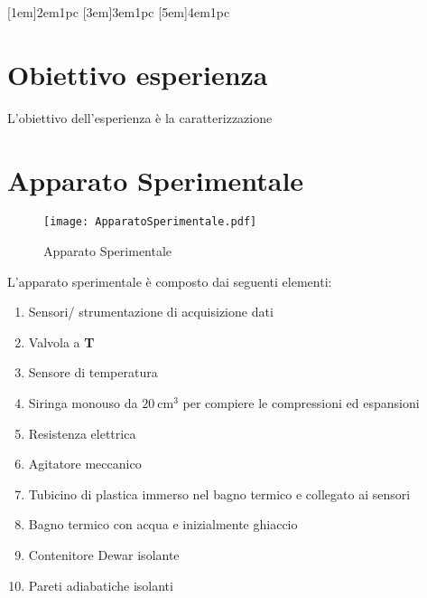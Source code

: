 \documentclass[a4paper,11pt,oneside]{article}
\begin{document}

\clearpage
\tableofcontents
{}
\contentsmargin{6em}
[1em]{\bigskip}{2em}{1pc}
[3em]{\smallskip}{3em}{1pc}
[5em]{\smallskip}{4em}{1pc}


\newpage


\section{Obiettivo esperienza}
L'obiettivo dell'esperienza è la caratterizzazione

\section{Apparato Sperimentale}
\begin{figure}[h!]
    \centering
    \texttt{[image: ApparatoSperimentale.pdf]}
    \caption{Apparato Sperimentale}
    \label{fig:apparato_sperimentale}
\end{figure}

L'apparato sperimentale è composto dai seguenti elementi: 
\begin{enumerate}[label=\textbf{\alph*.}]
    \item Sensori/ strumentazione di acquisizione dati
    \item Valvola a \textbf{T}
    \item Sensore di temperatura
    \item Siringa monouso da $\SI{20}{\centi\meter\cubed}$ per compiere le compressioni ed espansioni
    \item Resistenza elettrica
    \item Agitatore meccanico
    \item Tubicino di plastica immerso nel bagno termico e collegato ai sensori
    \item Bagno termico con acqua e inizialmente ghiaccio
    \item Contenitore Dewar isolante
    \item Pareti adiabatiche isolanti
\end{enumerate}
\end{document}
